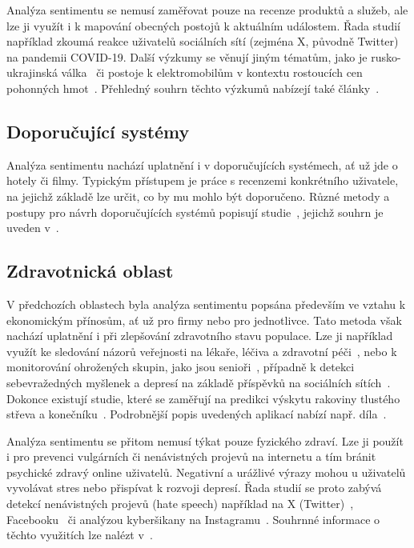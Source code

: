 Analýza sentimentu se nemusí zaměřovat pouze na recenze produktů a služeb, ale lze ji využít i k mapování obecných postojů k aktuálním událostem. Řada studií~\cite{ManguriCovid, NaseemCovid, CHAKRABORTY2020106754, ALAMOODI2021114155, Abd-Alrazaq} například zkoumá reakce uživatelů sociálních sítí (zejména X, původně Twitter) na pandemii COVID-19. Další výzkumy se věnují jiným tématům, jako je rusko-ukrajinská válka~\cite{baker2023prediction} či postoje k elektromobilům v kontextu rostoucích cen pohonných hmot~\cite{JihadEV}. Přehledný souhrn těchto výzkumů nabízejí také články~\cite{kumar2023comprehensivereviewsentimentanalysis, MAO2024102048}.

\subsection{Doporučující systémy}
Analýza sentimentu nachází uplatnění i v doporučujících systémech, ať už jde o hotely či filmy. Typickým přístupem je práce s recenzemi konkrétního uživatele, na jejichž základě lze určit, co by mu mohlo být doporučeno. Různé metody a postupy pro návrh doporučujících systémů popisují studie~\cite{SHEN2019249, LI2016164, SERRANOGUERRERO2020106768, RAY2021106935, FU2020106803}, jejichž souhrn je uveden v~\cite{BIRJALI2021107134}.

\subsection{Zdravotnická oblast}
V předchozích oblastech byla analýza sentimentu popsána především ve vztahu k ekonomickým přínosům, ať už pro firmy nebo pro jednotlivce. Tato metoda však nachází uplatnění i při zlepšování zdravotního stavu populace. Lze ji například využít ke sledování názorů veřejnosti na lékaře, léčiva a zdravotní péči~\cite{JIMENEZZAFRA201950, Ramírez-Tinoco2019, clark2018sentimentanalysisbreastcancer}, nebo k monitorování ohrožených skupin, jako jsou senioři~\cite{Ayata2020}, případně k detekci sebevražedných myšlenek a depresí na základě příspěvků na sociálních sítích~\cite{Desmet2013, Wang2013, Jung2017}. Dokonce existují studie, které se zaměřují na predikci výskytu rakoviny tlustého střeva a konečníku~\cite{Baker2023}. Podrobnější popis uvedených aplikací nabízí např. díla~\cite{kumar2023comprehensivereviewsentimentanalysis, MAO2024102048, BIRJALI2021107134}.

Analýza sentimentu se přitom nemusí týkat pouze fyzického zdraví. Lze ji použít i pro prevenci vulgárních či nenávistných projevů na internetu a tím bránit psychické zdravý online uživatelů. Negativní a urážlivé výrazy mohou u uživatelů vyvolávat stres nebo přispívat k rozvoji depresí. Řada studií se proto zabývá detekcí nenávistných projevů (hate speech) například na X (Twitter)~\cite{Jiang2019, Badjatiya_2017}, Facebooku~\cite{8669073} či analýzou kyberšikany na Instagramu~\cite{Zidny2019}. Souhrnné informace o těchto využitích lze nalézt v~\cite{kumar2023comprehensivereviewsentimentanalysis}.

